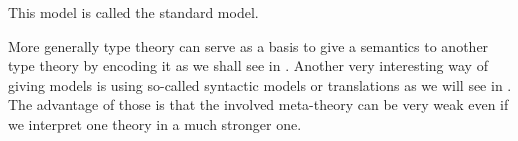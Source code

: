 This model is called the standard model.

More generally type theory can serve as a basis to give a semantics to another
type theory by encoding it as we shall see in .
Another very interesting way of giving models is using so-called syntactic
models or translations as we will see in . The advantage
of those is that the involved meta-theory can be very weak even if we interpret
one theory in a much stronger one.